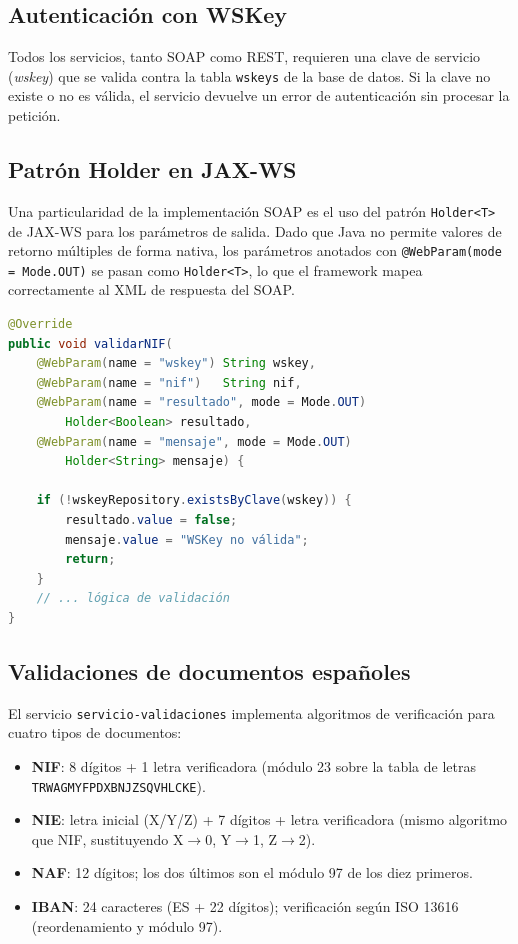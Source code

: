 \documentclass[12pt, a4paper]{article}
\begin{document}
\subsection{Autenticación con WSKey}

Todos los servicios, tanto SOAP como REST, requieren una clave de servicio (\textit{wskey}) que se valida contra la tabla \texttt{wskeys} de la base de datos. Si la clave no existe o no es válida, el servicio devuelve un error de autenticación sin procesar la petición.

\subsection{Patrón Holder en JAX-WS}

Una particularidad de la implementación SOAP es el uso del patrón \texttt{Holder<T>} de JAX-WS para los parámetros de salida. Dado que Java no permite valores de retorno múltiples de forma nativa, los parámetros anotados con \texttt{@WebParam(mode = Mode.OUT)} se pasan como \texttt{Holder<T>}, lo que el framework mapea correctamente al XML de respuesta del SOAP.

\begin{lstlisting}[language=Java, caption={Ejemplo de firma con Holder (ValidacionesImpl)}]
@Override
public void validarNIF(
    @WebParam(name = "wskey") String wskey,
    @WebParam(name = "nif")   String nif,
    @WebParam(name = "resultado", mode = Mode.OUT)
        Holder<Boolean> resultado,
    @WebParam(name = "mensaje", mode = Mode.OUT)
        Holder<String> mensaje) {

    if (!wskeyRepository.existsByClave(wskey)) {
        resultado.value = false;
        mensaje.value = "WSKey no válida";
        return;
    }
    // ... lógica de validación
}
\end{lstlisting}

\subsection{Validaciones de documentos españoles}

El servicio \texttt{servicio-validaciones} implementa algoritmos de verificación para cuatro tipos de documentos:

\begin{itemize}
  \item \textbf{NIF}: 8 dígitos + 1 letra verificadora (módulo 23 sobre la tabla de letras \texttt{TRWAGMYFPDXBNJZSQVHLCKE}).
  \item \textbf{NIE}: letra inicial (X/Y/Z) + 7 dígitos + letra verificadora (mismo algoritmo que NIF, sustituyendo X$\to$0, Y$\to$1, Z$\to$2).
  \item \textbf{NAF}: 12 dígitos; los dos últimos son el módulo 97 de los diez primeros.
  \item \textbf{IBAN}: 24 caracteres (ES + 22 dígitos); verificación según ISO 13616 (reordenamiento y módulo 97).
\end{itemize}
\end{document}
